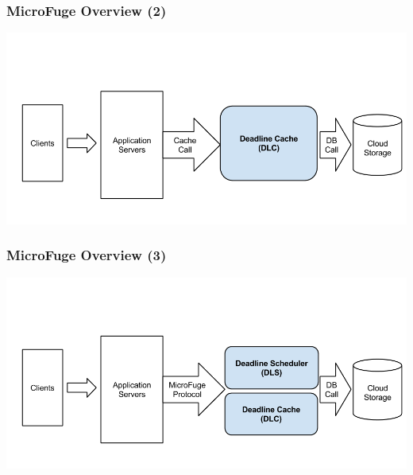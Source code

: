 \documentclass{beamer}
\begin{document}
\begin{frame}
  \frametitle{MicroFuge Overview (2)}
  \begin{center}
  \includegraphics[scale=0.32]{img/MF_FULL_NEW_2.png}
  \end{center}
\end{frame}

\begin{frame}
  \frametitle{MicroFuge Overview (3)}
  \begin{center}
  \includegraphics[scale=0.32]{img/MF_FULL_NEW_3.png}
  \end{center}
\end{frame}
\end{document}
